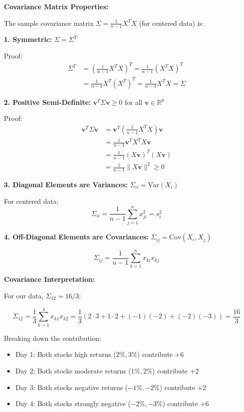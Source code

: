 \documentclass[12pt]{article}
\begin{document}
\begin{explanation}

\textbf{Covariance Matrix Properties:}

The sample covariance matrix $\Sigma = \frac{1}{n-1}X^TX$ (for centered data) is:

\textbf{1. Symmetric:} $\Sigma = \Sigma^T$

Proof:
\begin{align*}
\Sigma^T &= \left(\frac{1}{n-1}X^TX\right)^T = \frac{1}{n-1}(X^TX)^T \\
&= \frac{1}{n-1}X^T(X^T)^T = \frac{1}{n-1}X^TX = \Sigma
\end{align*}

\textbf{2. Positive Semi-Definite:} $\mathbf{v}^T\Sigma\mathbf{v} \geq 0$ for all $\mathbf{v} \in \mathbb{R}^p$

Proof:
\begin{align*}
\mathbf{v}^T\Sigma\mathbf{v} &= \mathbf{v}^T\left(\frac{1}{n-1}X^TX\right)\mathbf{v} \\
&= \frac{1}{n-1}\mathbf{v}^TX^TX\mathbf{v} \\
&= \frac{1}{n-1}(X\mathbf{v})^T(X\mathbf{v}) \\
&= \frac{1}{n-1}\|X\mathbf{v}\|^2 \geq 0
\end{align*}

\textbf{3. Diagonal Elements are Variances:} $\Sigma_{ii} = \text{Var}(X_i)$

For centered data:
\[
\Sigma_{ii} = \frac{1}{n-1}\sum_{j=1}^n x_{ji}^2 = s_i^2
\]

\textbf{4. Off-Diagonal Elements are Covariances:} $\Sigma_{ij} = \text{Cov}(X_i, X_j)$

\[
\Sigma_{ij} = \frac{1}{n-1}\sum_{k=1}^n x_{ki}x_{kj}
\]

\textbf{Covariance Interpretation:}

For our data, $\Sigma_{12} = 16/3$:

\[
\Sigma_{12} = \frac{1}{3}\sum_{k=1}^4 x_{k1}x_{k2} = \frac{1}{3}(2 \cdot 3 + 1 \cdot 2 + (-1)(-2) + (-2)(-3)) = \frac{16}{3}
\]

Breaking down the contribution:
\begin{itemize}
    \item Day 1: Both stocks high returns ($2\%, 3\%$) contribute $+6$
    \item Day 2: Both stocks moderate returns ($1\%, 2\%$) contribute $+2$
    \item Day 3: Both stocks negative returns ($-1\%, -2\%$) contribute $+2$
    \item Day 4: Both stocks strongly negative ($-2\%, -3\%$) contribute $+6$
\end{itemize}


\end{explanation}
\end{document}
